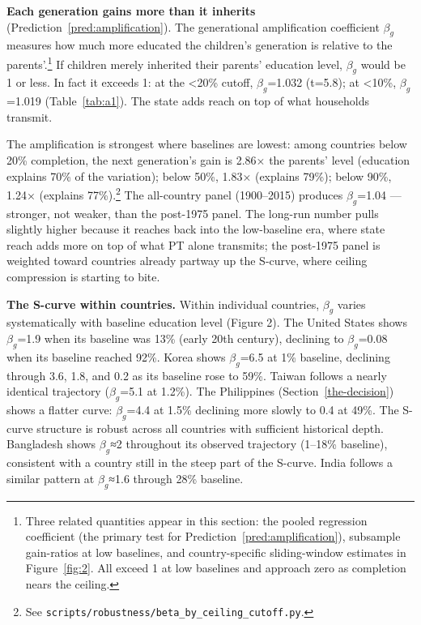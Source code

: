 \documentclass[12pt,letterpaper]{article}
\begin{document}
\textbf{Each generation gains more than it inherits}
(Prediction~\ref{pred:amplification}). The generational amplification
coefficient $\beta_g$ measures how much more educated the children's
generation is relative to the parents'.\footnote{Three related quantities appear in this section: the pooled regression coefficient (the primary test for Prediction~\ref{pred:amplification}), subsample gain-ratios at low baselines, and country-specific sliding-window estimates in Figure~\ref{fig:2}. All exceed 1 at low baselines and approach zero as completion nears the ceiling.} If children merely inherited
their parents' education level, $\beta_g$ would be 1 or less. In fact it
exceeds 1: at the \textless{}20\% cutoff, $\beta_g$=1.032 (t=5.8);
at \textless{}10\%, $\beta_g$=1.019 (Table~\ref{tab:a1}). The state adds reach
on top of what households transmit.

The amplification is strongest where baselines are lowest: among
countries below 20\% completion, the next generation's gain is 2.86×
the parents' level (education explains 70\% of the variation); below
50\%, 1.83× (explains 79\%); below 90\%, 1.24× (explains
77\%).\footnote{See \texttt{scripts/robustness/beta\_by\_ceiling\_cutoff.py}.}
The all-country panel (1900--2015) produces $\beta_g$=1.04 --- stronger,
not weaker, than the post-1975 panel. The long-run number pulls slightly
higher because it reaches back into the low-baseline era, where state
reach adds more on top of what PT alone transmits; the post-1975 panel
is weighted toward countries already partway up the S-curve, where
ceiling compression is starting to bite.

\textbf{The S-curve within countries.} Within individual countries,
$\beta_g$ varies systematically with baseline education level (Figure
2). The United States shows $\beta_g$=1.9 when its baseline was 13\%
(early 20th century), declining to $\beta_g$=0.08 when its baseline
reached 92\%. Korea shows $\beta_g$=6.5 at 1\% baseline, declining
through 3.6, 1.8, and 0.2 as its baseline rose to 59\%. Taiwan follows
a nearly identical trajectory ($\beta_g$=5.1 at 1.2\%). The Philippines
(Section~\ref{the-decision}) shows a flatter curve: $\beta_g$=4.4 at 1.5\% declining
more slowly to 0.4 at 49\%. The S-curve structure is robust across all
countries with sufficient historical depth. Bangladesh shows
$\beta_g$≈2 throughout its observed trajectory (1--18\% baseline),
consistent with a country still in the steep part of the S-curve. India
follows a similar pattern at $\beta_g$≈1.6 through 28\% baseline.
\end{document}

